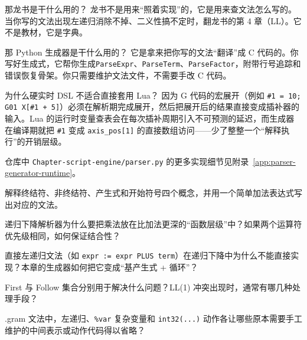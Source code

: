 \begin{anybox}{那龙书是干什么用的？}
龙书不是用来“照着实现”的，它是用来查文法怎么写的。当你写的文法出现左递归消除不掉、二义性搞不定时，翻龙书的第 4 章（LL）。它不是教材，它是字典。
\end{anybox}

\begin{anybox}{那 Python 生成器是干什么用的？}
它是拿来把你写的文法“翻译”成 C 代码的。你写好生成式，它帮你生成\texttt{ParseExpr}、\texttt{ParseTerm}、\texttt{ParseFactor}，附带行号追踪和错误恢复骨架。你只需要维护文法文件，不需要手改 C 代码。
\end{anybox}

\begin{anybox}{为什么硬实时 DSL 不适合直接套用 Lua？}
因为 G 代码的宏展开（例如 \texttt{\#1 = 10; G01 X[\#1 + 5]}）必须在解析期完成展开，然后把展开后的结果直接变成插补器的输入。Lua 的运行时变量查表会在每次插补周期引入不可预测的延迟，而生成器在编译期就把 \texttt{\#1} 变成 \texttt{axis\_pos[1]} 的直接数组访问——少了整整一个“解释执行”的开销层级。
\end{anybox}

仓库中 \texttt{Chapter-script-engine/parser.py} 的更多实现细节见附录~\ref{app:parser-generator-runtime}。

\begin{problemset}
\item 解释终结符、非终结符、产生式和开始符号四个概念，并用一个简单加法表达式写出对应的文法。
\item 递归下降解析器为什么要把乘法放在比加法更深的“函数层级”中？如果两个运算符优先级相同，如何保证结合性？
\item 直接左递归文法（如 \texttt{expr := expr PLUS term}）在递归下降中为什么不能直接实现？本章的生成器如何把它变成“基产生式 + 循环”？
\item First 与 Follow 集合分别用于解决什么问题？LL(1) 冲突出现时，通常有哪几种处理手段？
\item .gram 文法中，左递归、\texttt{\%var} 复杂变量和 \texttt{int32(...)} 动作各让哪些原本需要手工维护的中间表示或动作代码得以省略？
\end{problemset}
